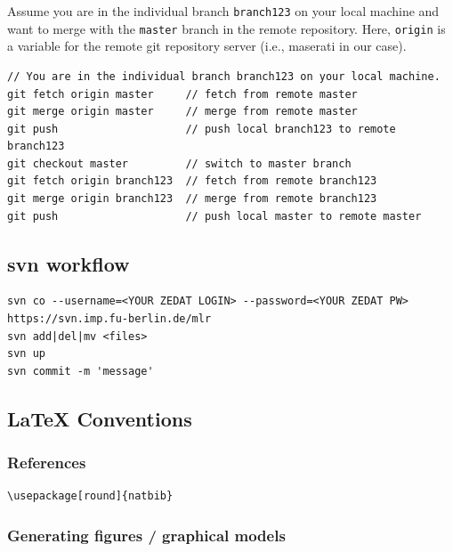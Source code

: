 Assume you are in the individual branch \verb+branch123+ on your local machine and want to merge 
with the \verb+master+ branch in the remote repository. Here, \verb+origin+ is a variable
for the remote git repository server (i.e., maserati in our case).
\begin{verbatim}
// You are in the individual branch branch123 on your local machine.
git fetch origin master     // fetch from remote master
git merge origin master     // merge from remote master
git push                    // push local branch123 to remote branch123
git checkout master         // switch to master branch
git fetch origin branch123  // fetch from remote branch123
git merge origin branch123  // merge from remote branch123
git push                    // push local master to remote master
\end{verbatim}






\subsection{svn workflow}

\begin{code}
\begin{verbatim}
svn co --username=<YOUR ZEDAT LOGIN> --password=<YOUR ZEDAT PW> https://svn.imp.fu-berlin.de/mlr
svn add|del|mv <files>
svn up
svn commit -m 'message'
\end{verbatim}
\end{code}



\subsection{LaTeX Conventions}

\subsubsection{References}

\begin{code}
\begin{verbatim}
\usepackage[round]{natbib}

\end{verbatim}
\end{code}

\subsubsection{Generating figures / graphical models}

